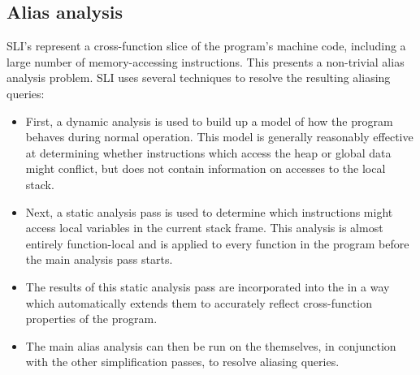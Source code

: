 



  
\subsection{Alias analysis}
\label{sect:alias_analysis}


SLI's {\StateMachines} represent a cross-function slice of the
program's machine code, including a large number of memory-accessing
instructions.  This presents a non-trivial alias analysis problem.
SLI uses several techniques to resolve the resulting aliasing queries:

\begin{itemize}
\item
  First, a dynamic analysis is used to build up a model of how the
  program behaves during normal operation.  This model is generally
  reasonably effective at determining whether instructions which
  access the heap or global data might conflict, but does not contain
  information on accesses to the local stack.
\item
  Next, a static analysis pass is used to determine which instructions
  might access local variables in the current stack frame.  This
  analysis is almost entirely function-local and is applied to every
  function in the program before the main analysis pass starts.
\item
  The results of this static analysis pass are incorporated into the
  {\StateMachines} in a way which automatically extends them to
  accurately reflect cross-function properties of the program.
\item
  The main alias analysis can then be run on the {\StateMachines}
  themselves, in conjunction with the other {\StateMachine}
  simplification passes, to resolve aliasing queries.
\end{itemize}

